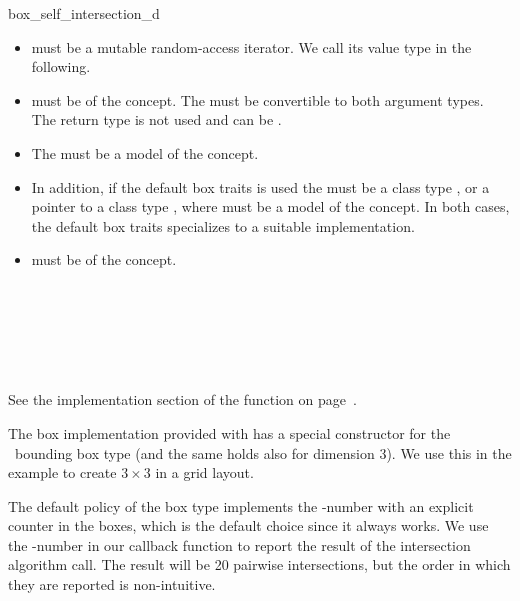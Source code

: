 \begin{ccRefFunction}{box_self_intersection_d}
\begin{itemize}
  \item
     must be a mutable random-access
    iterator. We call its value type  in the following.
  \item
     must be of the  concept. 
    The  must be convertible to both argument types. The
    return type is not used and can be .
  \item
    The  must be a model of the  concept.
  \item
    In addition, if the default box traits is used the  must be 
    a class type , or a pointer to a class type , where
     must be a model of the  concept.
    In both cases, the default box traits specializes to a suitable
    implementation.
  \item
     must be of the  concept.
\end{itemize}

\ccSeeAlso

\\
\\

\\
\\

\ccImplementation

See the implementation section of the 
function on page~.

\ccExample

The box implementation provided with
 has a special
constructor for the \cgal\ bounding box type  (and
the same holds also for dimension 3). We use this in the example to
create $3 \times 3$  in a grid layout.

The default policy of the box type implements the -number with
an explicit counter in the boxes, which is the default choice since it
always works. We use the -number in our callback function to
report the result of the intersection algorithm call. The result will
be 20 pairwise intersections, but the order in which they are reported
is non-intuitive.


\end{ccRefFunction}


